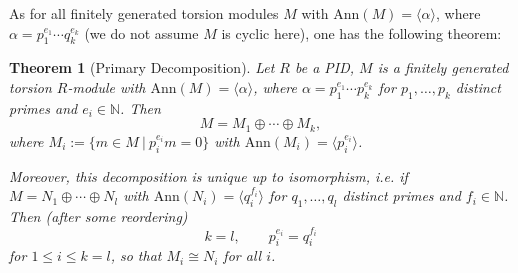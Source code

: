 \documentclass[12pt]{amsbook}
\newtheorem{theorem}{Theorem}[section]
\begin{document}
As for all finitely generated torsion modules $M$ with $\mathrm{Ann}(M)=\langle\alpha\rangle$, where $\alpha=p_1^{e_1}\cdots q_k^{e_k}$
(we do not assume $M$ is cyclic here), one has the following theorem:

\begin{theorem} [Primary Decomposition] \label{thm-primarydecomp}
    Let $R$ be a PID, $M$ is a finitely generated torsion $R$-module with $\mathrm{Ann}(M)=\langle\alpha\rangle$, where $\alpha=p_1^{e_1}\cdots p_k^{e_k}$ for $p_1, \dots, p_k$ distinct primes and $e_i \in \mathbb{N}$. Then
    $$M=M_1\oplus\cdots\oplus M_k,$$
    where $M_i:=\{m\in M\ |\ p_i^{e_i}m=0\}$ with $\mathrm{Ann}(M_i)=\langle p_i^{e_i}\rangle$.
    
    Moreover, this decomposition is unique up to isomorphism, i.e. if $M=N_1\oplus\cdots\oplus N_l$ with $\mathrm{Ann}(N_i)=\langle q_i^{f_i}\rangle$ for $q_1, \dots, q_l$ distinct primes and $f_i \in \mathbb{N}$. Then (after some reordering)
    $$k=l,\quad\quad p_i^{e_i}=q_i^{f_i}$$
    for $1\leq i\leq k = l$, so that $M_i\cong N_i$ for all $i$.
\end{theorem}
\end{document}
